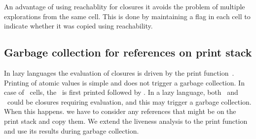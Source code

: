 \documentclass[9pt]{sigplanconf}
\newcommand{\cred}[1]{{\color{red}{#1}}}
\begin{document}
An advantage of  using reachablity for closures it  avoids the problem
of  multiple  explorations  from  the  same  cell.  This  is  done  by
maintaining  a flag in  each cell  to indicate  whether it  was copied
using  reachability. 


\subsection{Garbage collection for references on print stack}
In lazy  languages the evaluation of  closures is driven  by the print
function~\cite{Jones87}.  Printing of  atomic values is
simple  and  does  not  trigger  a garbage  collection.   In  case  of
\CONS\ cells, the \CAR\ is first  printed followed by \CDR.  In a lazy
language, both \CAR\ and \CDR\ could be closures requiring evaluation,
and this  may trigger  a garbage collection.   When this  happens.  we
have to consider  any references that might be on  the print stack and
copy them. We extend the liveness analysis to the print function and
use its results during garbage collection.



\end{document}
